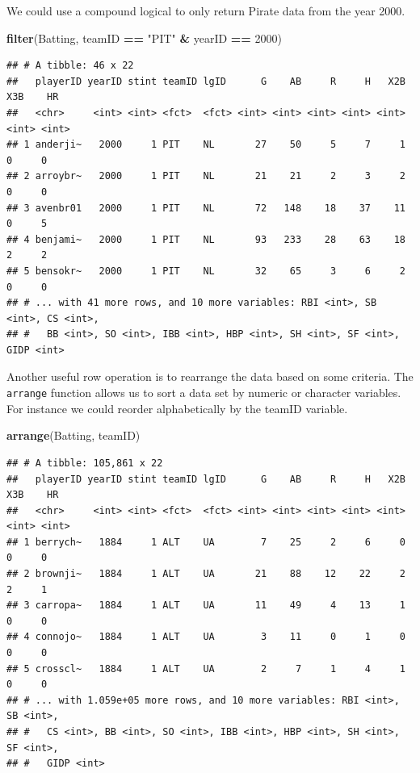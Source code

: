 \documentclass[
]{book}
\newenvironment{Shaded}{\begin{snugshade}}{\end{snugshade}}
\newcommand{\DecValTok}[1]{\textcolor[rgb]{0.00,0.00,0.81}{#1}}
\newcommand{\KeywordTok}[1]{\textcolor[rgb]{0.13,0.29,0.53}{\textbf{#1}}}
\newcommand{\NormalTok}[1]{#1}
\newcommand{\OperatorTok}[1]{\textcolor[rgb]{0.81,0.36,0.00}{\textbf{#1}}}
\newcommand{\StringTok}[1]{\textcolor[rgb]{0.31,0.60,0.02}{#1}}
\theoremstyle{definition}
\theoremstyle{definition}
\theoremstyle{definition}
\theoremstyle{remark}
\begin{document}
We could use a compound logical to only return Pirate data from the year 2000.

\begin{Shaded}
\begin{Highlighting}[]
\KeywordTok{filter}\NormalTok{(Batting, teamID }\OperatorTok{==}\StringTok{ "PIT"} \OperatorTok{&}\StringTok{ }\NormalTok{yearID }\OperatorTok{==}\StringTok{ }\DecValTok{2000}\NormalTok{)}
\end{Highlighting}
\end{Shaded}

\begin{verbatim}
## # A tibble: 46 x 22
##   playerID yearID stint teamID lgID      G    AB     R     H   X2B   X3B    HR
##   <chr>     <int> <int> <fct>  <fct> <int> <int> <int> <int> <int> <int> <int>
## 1 anderji~   2000     1 PIT    NL       27    50     5     7     1     0     0
## 2 arroybr~   2000     1 PIT    NL       21    21     2     3     2     0     0
## 3 avenbr01   2000     1 PIT    NL       72   148    18    37    11     0     5
## 4 benjami~   2000     1 PIT    NL       93   233    28    63    18     2     2
## 5 bensokr~   2000     1 PIT    NL       32    65     3     6     2     0     0
## # ... with 41 more rows, and 10 more variables: RBI <int>, SB <int>, CS <int>,
## #   BB <int>, SO <int>, IBB <int>, HBP <int>, SH <int>, SF <int>, GIDP <int>
\end{verbatim}

Another useful row operation is to rearrange the data based on some criteria. The \texttt{arrange} function allows us to sort a data set by numeric or character variables. For instance we could reorder alphabetically by the teamID variable.

\begin{Shaded}
\begin{Highlighting}[]
\KeywordTok{arrange}\NormalTok{(Batting, teamID)}
\end{Highlighting}
\end{Shaded}

\begin{verbatim}
## # A tibble: 105,861 x 22
##   playerID yearID stint teamID lgID      G    AB     R     H   X2B   X3B    HR
##   <chr>     <int> <int> <fct>  <fct> <int> <int> <int> <int> <int> <int> <int>
## 1 berrych~   1884     1 ALT    UA        7    25     2     6     0     0     0
## 2 brownji~   1884     1 ALT    UA       21    88    12    22     2     2     1
## 3 carropa~   1884     1 ALT    UA       11    49     4    13     1     0     0
## 4 connojo~   1884     1 ALT    UA        3    11     0     1     0     0     0
## 5 crosscl~   1884     1 ALT    UA        2     7     1     4     1     0     0
## # ... with 1.059e+05 more rows, and 10 more variables: RBI <int>, SB <int>,
## #   CS <int>, BB <int>, SO <int>, IBB <int>, HBP <int>, SH <int>, SF <int>,
## #   GIDP <int>
\end{verbatim}
\end{document}
